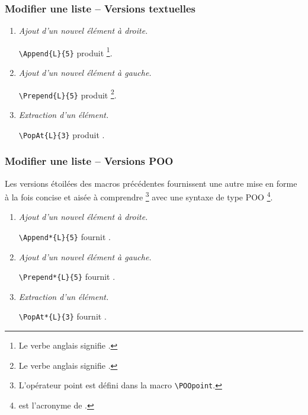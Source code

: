 \documentclass[12pt,a4paper]{article}
\begin{document}
\subsubsection{Modifier une liste -- Versions textuelles}

\begin{enumerate}
	\item \textit{Ajout d'un nouvel élément à droite.}

	      \verb+\Append{L}{5}+ produit 
	      \footnote{
		       Le verbe anglais  signifie .
		  }.


	\item \textit{Ajout d'un nouvel élément à gauche.}

	      \verb+\Prepend{L}{5}+ produit 
	      \footnote{
		       Le verbe anglais  signifie .
		  }.


	\item \textit{Extraction d'un élément.}

	      \verb+\PopAt{L}{3}+ produit .
\end{enumerate}



\subsubsection{Modifier une liste -- Versions POO}

Les versions étoilées des macros précédentes fournissent une autre mise en forme à la fois concise et aisée à comprendre
\footnote{
	L'opérateur point \POOpoint{} est défini dans la macro \texttt{\textbackslash{}POOpoint}.
}
avec une syntaxe de type POO
\footnote{
	 est l'acronyme de .
}.


\begin{enumerate}
	\item \textit{Ajout d'un nouvel élément à droite.}

	      \verb++ fournit \Append*{L}{5}.


	\item \textit{Ajout d'un nouvel élément à gauche.}

	      \verb++ fournit \Prepend*{L}{5}.


	\item \textit{Extraction d'un élément.}

	      \verb++ fournit \PopAt*{L}{3}.
\end{enumerate}
\end{document}
